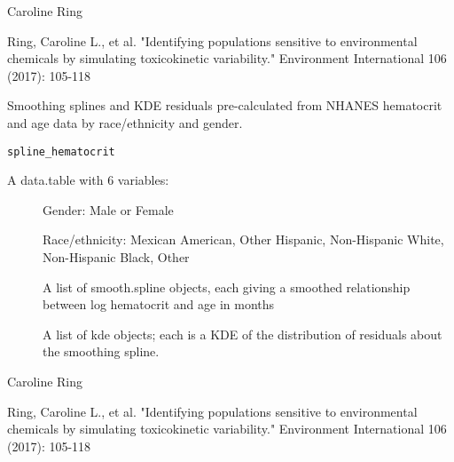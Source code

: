\documentclass[a4paper]{book}
\begin{document}
%
\begin{Author}\relax
Caroline Ring
\end{Author}
%
\begin{References}\relax
Ring, Caroline L., et al. "Identifying populations sensitive to
environmental chemicals by simulating toxicokinetic variability." Environment
International 106 (2017): 105-118
\end{References}
%
\begin{Description}\relax
Smoothing splines and KDE residuals pre-calculated from NHANES hematocrit and
age data by race/ethnicity and gender.
\end{Description}
%
\begin{Usage}
\begin{verbatim}
spline_hematocrit
\end{verbatim}
\end{Usage}
%
\begin{Format}
A data.table with 6 variables: \begin{description}
 \item[] Gender:
Male or Female\item[] Race/ethnicity: Mexican American, Other
Hispanic, Non-Hispanic White, Non-Hispanic Black, Other
\item[] A list of smooth.spline objects, each giving a
smoothed relationship between log hematocrit and age in months
\item[] A list of kde objects; each is a KDE of the
distribution of residuals about the smoothing spline.
\end{description}

\end{Format}
%
\begin{Author}\relax
Caroline Ring
\end{Author}
%
\begin{References}\relax
Ring, Caroline L., et al. "Identifying populations sensitive to
environmental chemicals by simulating toxicokinetic variability." Environment
International 106 (2017): 105-118
\end{References}
\end{document}
